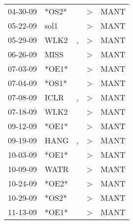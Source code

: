 \begin{supertabular}{p{0.07\textwidth}p{0.06\textwidth}p{0.02\textwidth}p{0.02\textwidth}p{0.06\textwidth}}
          04-30-09\textsuperscript{} &                            *OS2* &                  &  \textgreater &           MANT\textsuperscript{} \\
          05-22-09\textsuperscript{} &           sol1\textsuperscript{} &                  &  \textgreater &           MANT\textsuperscript{} \\
          05-29-09\textsuperscript{} &           WLK2\textsuperscript{} &                , &  \textgreater &           MANT\textsuperscript{} \\
          06-26-09\textsuperscript{} &           MISS\textsuperscript{} &                  &  \textgreater &           MANT\textsuperscript{} \\
          07-03-09\textsuperscript{} &                            *OE1* &                  &  \textgreater &           MANT\textsuperscript{} \\
          07-04-09\textsuperscript{} &                            *OS1* &                  &  \textgreater &           MANT\textsuperscript{} \\
          07-08-09\textsuperscript{} &           ICLR\textsuperscript{} &                , &  \textgreater &           MANT\textsuperscript{} \\
          07-18-09\textsuperscript{} &           WLK2\textsuperscript{} &                  &  \textgreater &           MANT\textsuperscript{} \\
          09-12-09\textsuperscript{} &                            *OE1* &                  &  \textgreater &           MANT\textsuperscript{} \\
          09-19-09\textsuperscript{} &           HANG\textsuperscript{} &                , &  \textgreater &           MANT\textsuperscript{} \\
          10-03-09\textsuperscript{} &                            *OE1* &                  &  \textgreater &           MANT\textsuperscript{} \\
          10-09-09\textsuperscript{} &           WATR\textsuperscript{} &                  &  \textgreater &           MANT\textsuperscript{} \\
          10-24-09\textsuperscript{} &                            *OE2* &                  &  \textgreater &           MANT\textsuperscript{} \\
          10-29-09\textsuperscript{} &                            *OS2* &                  &  \textgreater &           MANT\textsuperscript{} \\
          11-13-09\textsuperscript{} &                            *OE1* &                  &  \textgreater &           MANT\textsuperscript{} \\

\end{supertabular}
